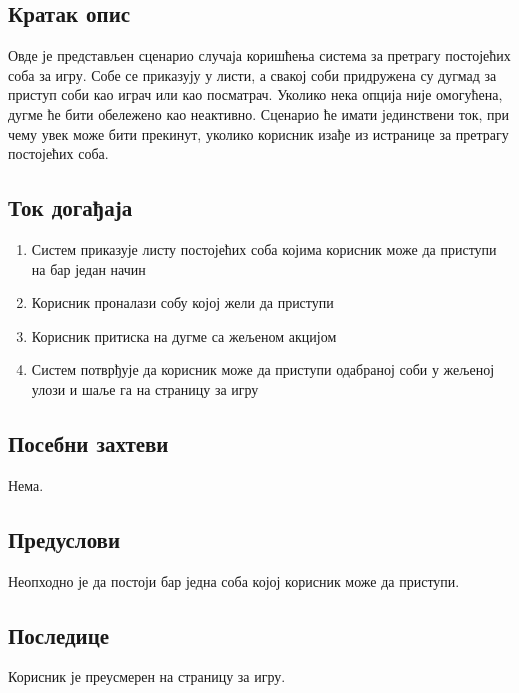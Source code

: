 \subsection{Кратак опис}
Овде је представљен сценарио случаја коришћења система за претрагу постојећих соба за игру.
Собе се приказују у листи, а свакој соби придружена су дугмад за приступ соби као играч или
као посматрач. Уколико нека опција није омогућена, дугме ће бити обележено као неактивно.
Сценарио ће имати јединствени ток, при чему увек може бити прекинут, уколико корисник изађе из
истранице за претрагу постојећих соба.

\subsection{Ток догађаја}
\begin{enumerate}
	\item Систем приказује листу постојећих соба којима корисник може да приступи на бар један
	      начин
	\item Корисник проналази собу којој жели да приступи
	\item Корисник притиска на дугме са жељеном акцијом
	\item Систем потврђује да корисник може да приступи одабраној соби у жељеној улози
	      и шаље га на страницу за игру
\end{enumerate}

\subsection{Посебни захтеви}
Нема.

\subsection{Предуслови}
Неопходно је да постоји бар једна соба којој корисник може да приступи.

\subsection{Последице}
Корисник је преусмерен на страницу за игру.
